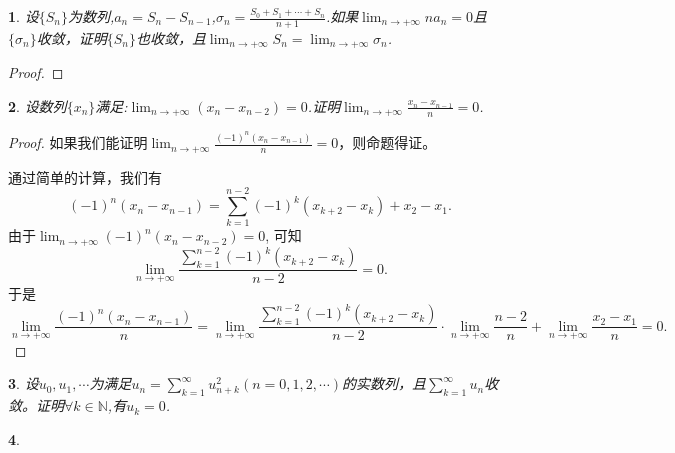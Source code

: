 \documentclass[utf8]{book}
\newtheorem{example}{}[section]             %
\begin{document}
\begin{example}
设$\{S_n\}$为数列,$a_n=S_n-S_{n-1}$,$\sigma_n = \displaystyle\frac{S_0+S_1+\cdots+S_n}{n+1}$.如果$\displaystyle\lim_{n\to +\infty}na_n=0$且$\{\sigma_n\}$收敛，证明$\{S_n\}$也收敛，且$\displaystyle\lim_{n\to +\infty}S_n = \displaystyle\lim_{n\to +\infty}\sigma_n$.
\end{example}
\begin{proof}

\end{proof}
\begin{example}
设数列$\{x_n\}$满足:$\displaystyle\lim_{n\to +\infty}(x_n-x_{n-2})=0$.证明$\displaystyle\lim_{n\to +\infty}\frac{x_n-x_{n-1}}{n} = 0$.
\end{example}
\begin{proof}如果我们能证明$\displaystyle\lim_{n\to +\infty}\frac{\left(-1\right)^n\left(x_n-x_{n-1}\right)}{n} = 0$，则命题得证。

通过简单的计算，我们有
$$\left(-1\right)^n\left(x_n-x_{n-1}\right) = \sum_{k=1}^{n-2}(-1)^k(x_{k+2}-x_k)+x_2-x_1.$$
由于$\displaystyle\lim_{n\to +\infty}(-1)^n(x_n-x_{n-2})=0$, 可知
$$\lim_{n\to +\infty}\displaystyle\frac{\displaystyle\sum_{k=1}^{n-2}(-1)^k(x_{k+2}-x_k)}{n-2} = 0.$$
于是
$$\displaystyle\lim_{n\to +\infty}\frac{\left(-1\right)^n\left(x_n-x_{n-1}\right)}{n}=\lim_{n\to +\infty}\displaystyle\frac{\displaystyle\sum_{k=1}^{n-2}(-1)^k(x_{k+2}-x_k)}{n-2}\cdot \lim_{n\to +\infty}\frac{n-2}{n}+\lim_{n\to +\infty}\frac{x_2-x_1}{n} = 0.$$
\end{proof}
\begin{example}
设$u_0,u_1,\cdots$为满足$u_n=\displaystyle\sum_{k=1}^{\infty}u^2_{n+k}(n=0,1,2,\cdots)$的实数列，且$\displaystyle\sum_{k=1}^{\infty}u_{n}$收敛。证明$\forall k\in\mathbb{N}$,有$u_k=0$.
\end{example}
\begin{example}
\end{example}




\end{document}
